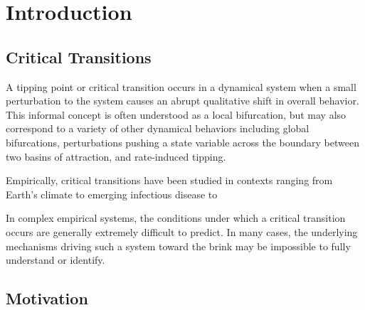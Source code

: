 \section{Introduction}
\label{sec:intro}

\subsection{Critical Transitions}

A tipping point or critical transition occurs in a dynamical system when a small perturbation to the system causes an abrupt qualitative shift in overall behavior. This informal concept is often understood as a local bifurcation, but may also correspond to a variety of other dynamical behaviors including global bifurcations, perturbations pushing a state variable across the boundary between two basins of attraction, and rate-induced tipping. 

Empirically, critical transitions have been studied in contexts ranging from Earth's climate \cite{lentonEarlyWarningClimate2011} to emerging infectious disease \cite{brettDynamicalFootprintsEnable2020} to


In complex empirical systems, the conditions under which a critical transition occurs are generally extremely difficult to predict. In many cases, the underlying mechanisms driving such a system toward the brink may be impossible to fully understand or identify. 

\subsection{Motivation}


\cite{george_early_2021}